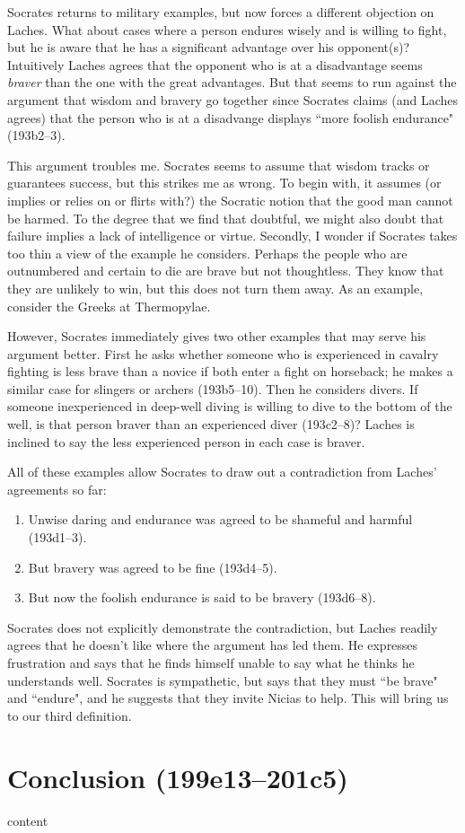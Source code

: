 \documentclass[11pt]{article}
\begin{document}
Socrates returns to military examples, but now forces a different objection on Laches.  What about cases where a person endures wisely and is willing to fight, but he is aware that he has a significant advantage over his opponent(s)?  Intuitively Laches agrees that the opponent who is at a disadvantage seems \emph{braver} than the one with the great advantages.  But that seems to run against the argument that wisdom and bravery go together since Socrates claims (and Laches agrees) that the person who is at a disadvange displays ``more foolish endurance" (193b2--3).

This argument troubles me.  Socrates seems to assume that wisdom tracks or guarantees success, but this strikes me as wrong.  To begin with, it assumes (or implies or relies on or flirts with?) the Socratic notion that the good man cannot be harmed.  To the degree that we find that doubtful, we might also doubt that failure implies a lack of intelligence or virtue.  Secondly, I wonder if Socrates takes too thin a view of the example he considers.  Perhaps the people who are outnumbered and certain to die are brave but not thoughtless.  They know that they are unlikely to win, but this does not turn them away.  As an example, consider the Greeks at Thermopylae.

However, Socrates immediately gives two other examples that may serve his argument better.  First he asks whether someone who is experienced in cavalry fighting is less brave than a novice if both enter a fight on horseback; he makes a similar case for slingers or archers (193b5--10).  Then he considers divers.  If someone inexperienced in deep-well diving is willing to dive to the bottom of the well, is that person braver than an experienced diver (193c2--8)?  Laches is inclined to say the less experienced person in each case is braver.

All of these examples allow Socrates to draw out a contradiction from Laches' agreements so far:

\begin{enumerate}
    \item Unwise daring and endurance was agreed to be shameful and harmful (193d1--3).
    \item But bravery was agreed to be fine (193d4--5).
    \item But now the foolish endurance is said to be bravery (193d6--8).
\end{enumerate}

Socrates does not explicitly demonstrate the contradiction, but Laches readily agrees that he doesn't like where the argument has led them.  He expresses frustration and says that he finds himself unable to say what he thinks he understands well.  Socrates is sympathetic, but says that they must ``be brave" and ``endure", and he suggests that they invite Nicias to help.  This will bring us to our third definition.



\section{Conclusion (199e13--201c5)}

content


\newpage


\end{document}
